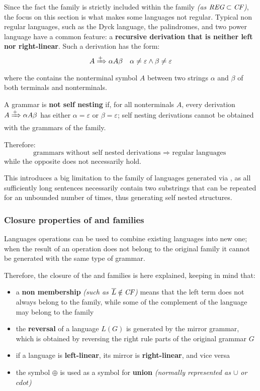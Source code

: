 \documentclass[english]{article}
\begin{document}
Since the fact the \REG family is strictly included within the \CF family \textit{(as \(\textit{REG} \subset \textit{CF}\))}, the focus on this section is what makes some languages not regular.
Typical non regular languages, such as the Dyck language, the palindromes, and two power language have a common feature:
a \textbf{recursive derivation that is neither left nor right-linear}.
Such a derivation has the form:
\[ A \xRightarrow{+} \alpha A \beta \quad \alpha \neq \varepsilon \land \beta \neq \varepsilon \]
where the \RP contains the nonterminal symbol \(A\) between two strings \(\alpha\) and \(\beta\) of both terminals and nonterminals.

\bigskip
A grammar is \textbf{not self nesting} if, for all nonterminals \(A\), every derivation \(A \xRightarrow{+} \alpha A \beta\) has either \(\alpha = \varepsilon\) or \(\beta = \varepsilon\);
self nesting derivations cannot be obtained with the grammars of the \REG family.

Therefore:
\[ \text{grammars without self nested derivations } \Rightarrow \text{ regular languages } \]
while the opposite does not necessarily hold.

\bigskip
This introduces a big limitation to the family of languages generated via \re, as all sufficiently long sentences necessarily contain two substrings that can be repeated for an unbounded number of times, thus generating self nested structures.

\subsubsection{Closure properties of \REG and \CF families}
\label{sec:closure-properties-reg-and-cf}

Languages operations can be used to combine existing languages into new one;
when the result of an operation does not belong to the original family it cannot be generated with the same type of grammar.

Therefore, the closure of the \REG and \CF families is here explained, keeping in mind that:

\begin{itemize}
  \item a \textbf{non membership} \textit{(such as \(\overline{L} \notin \textit{CF}\))} means that the left term does not always belong to the family, while some of the complement of the language may belong to the family
  \item the \textbf{reversal} of a language \(L(G)\) is generated by the mirror grammar, which is obtained by reversing the right rule parts of the original grammar \(G\)
  \item if a language is \textbf{left-linear}, its mirror is \textbf{right-linear}, and vice versa
  \item the symbol \(\oplus\) is used as a symbol for \textbf{union} \textit{(normally represented as \(\cup\) or \(cdot\))}
\end{itemize}
\end{document}
